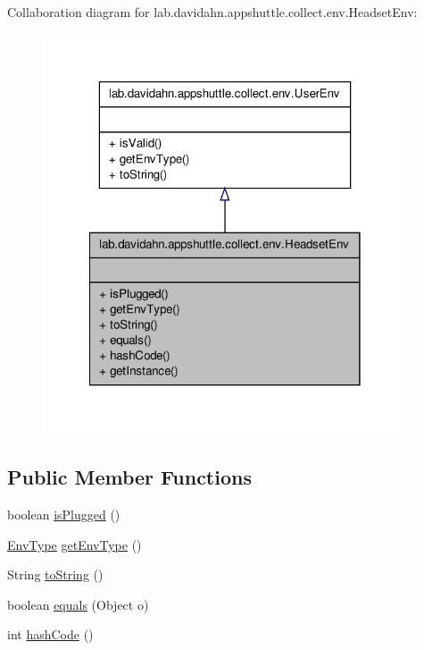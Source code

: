 \-Collaboration diagram for lab.\-davidahn.\-appshuttle.\-collect.\-env.\-Headset\-Env\-:
\nopagebreak
\begin{figure}[H]
\begin{center}
\leavevmode
\includegraphics[width=306pt]{classlab_1_1davidahn_1_1appshuttle_1_1collect_1_1env_1_1_headset_env__coll__graph}
\end{center}
\end{figure}
\subsection*{\-Public \-Member \-Functions}
\begin{DoxyCompactItemize}
\item 
boolean \hyperlink{classlab_1_1davidahn_1_1appshuttle_1_1collect_1_1env_1_1_headset_env_ad02f208eae962dcfb21fd2bc39e2bf81}{is\-Plugged} ()
\item 
\hyperlink{enumlab_1_1davidahn_1_1appshuttle_1_1collect_1_1env_1_1_env_type}{\-Env\-Type} \hyperlink{classlab_1_1davidahn_1_1appshuttle_1_1collect_1_1env_1_1_headset_env_aa819665aaf5d5be9e86b812a77a79e2c}{get\-Env\-Type} ()
\item 
\-String \hyperlink{classlab_1_1davidahn_1_1appshuttle_1_1collect_1_1env_1_1_headset_env_ad81bc791a832fb2051d7569326de6679}{to\-String} ()
\item 
boolean \hyperlink{classlab_1_1davidahn_1_1appshuttle_1_1collect_1_1env_1_1_headset_env_a5add75e10866468bd9f09dadbe182d62}{equals} (\-Object o)
\item 
int \hyperlink{classlab_1_1davidahn_1_1appshuttle_1_1collect_1_1env_1_1_headset_env_a13ab33b0efc3862b0c007b177d4cea4f}{hash\-Code} ()
\end{DoxyCompactItemize}
